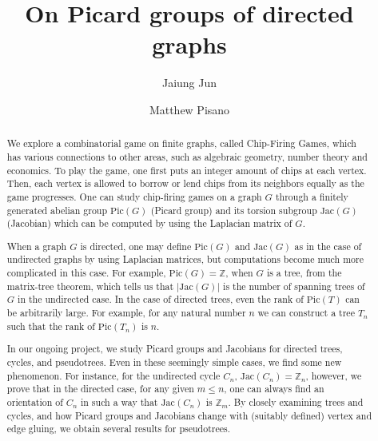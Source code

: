 \documentclass[11pt,reqno]{amsart}
\theoremstyle{definition}
\theoremstyle{plain}
\begin{document}
\title{On Picard groups of directed graphs}

\author{Jaiung Jun}
\address{Department of Mathematics, State University of New York at New Paltz, NY 12561, USA}

\author{Matthew Pisano}
\address{Department of Mathematics, State University of New York at New Paltz, NY 12561, USA}



\maketitle

\begin{abstract}
	We explore a combinatorial game on finite graphs, called Chip-Firing Games,
	which has various connections to other areas, such as algebraic geometry, number theory and economics.
	To play the game, one first puts an integer amount of chips at each vertex. Then,
	each vertex is allowed to borrow or lend chips from its neighbors equally as the game progresses.
	One can study chip-firing games on a graph $G$ through a finitely generated abelian group
	$\textrm{Pic}(G)$ (Picard group) and its torsion subgroup $\textrm{Jac}(G)$ (Jacobian) which can
	be computed by using the Laplacian matrix of $G$.

	When a graph $G$ is directed, one may define $\textrm{Pic}(G)$ and $\textrm{Jac}(G)$ as in the case of undirected
	graphs by using Laplacian matrices, but computations become much more complicated in this case. For example,
	$\textrm{Pic}(G)=\mathbb{Z}$, when $G$ is a tree, from the matrix-tree theorem, which tells us that $|\textrm{Jac}(G)|$ is
	the number of spanning trees of $G$ in the undirected case.
	In the case of directed trees, even the rank of $\textrm{Pic}(T)$ can be arbitrarily large.
	For example, for any natural number $n$ we can construct a tree $T_n$ such that the rank of $\textrm{Pic}(T_n)$ is $n$.

	In our ongoing project, we study Picard groups and Jacobians for directed trees, cycles, and pseudotrees.
	Even in these seemingly simple cases, we find some new phenomenon. For instance, for the undirected cycle $C_n$,
	$\textrm{Jac}(C_n)=\mathbb{Z}_n$, however, we prove that in the directed case, for any given $m \leq n$, one can
	always find an orientation of $C_n$ in such a way that $\textrm{Jac}(C_n)$ is $\mathbb{Z}_m$.
	By closely examining trees and cycles, and how Picard groups and Jacobians change with (suitably defined)
	vertex and edge gluing, we obtain several results for pseudotrees.
\end{abstract}
\end{document}
